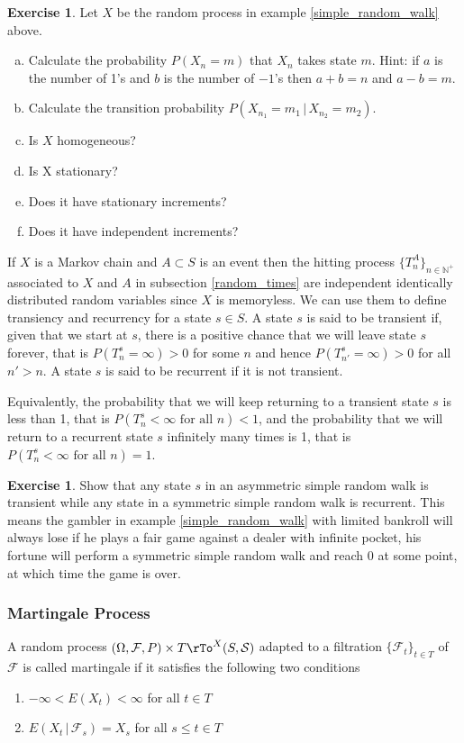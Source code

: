 \documentclass[12pt]{amsart}
\theoremstyle{definition}
\newtheorem{exercise}[theorem]{Exercise}
\begin{document}
\begin{exercise} Let $X$ be the random process in example \ref{simple_random_walk} above.
\begin{enumerate}[a.]
\item Calculate the probability $P(X_n = m)$ that $X_n$ takes state $m$. Hint: if $a$ is the number of 1's and $b$ is the number of $-1$'s then $a+b = n$ and $a - b = m$.
\item Calculate the transition probability $P(X_{n_1} = m_1 \,|\, X_{n_2} = m_2)$.
\item Is $X$ homogeneous?
\item Is X stationary?
\item Does it have stationary increments?
\item Does it have independent increments?
\end{enumerate}
\end{exercise}

If $X$ is a Markov chain and $A \subset S$ is an event then the hitting process $\{T_n^A\}_{n \in \mathbb{N}^+}$ associated to $X$ and $A$ in subsection \ref{random_times} are independent identically distributed random variables since $X$ is memoryless. We can use them to define transiency and recurrency for a state $s \in S$.
\dfn A state $s$ is said to be transient if, given that we start at $s$, there is a positive chance that we will leave state $s$ forever, that is $P(T_n^s = \infty) > 0$ for some $n$ and hence $P(T_{n'}^s = \infty) > 0$ for all $n' > n$. A state $s$ is said to be recurrent if it is not transient.

 Equivalently, the probability that we will keep returning to a transient state $s$ is less than 1, that is $P(T_n^s < \infty \text{ for all } n) < 1$, and the probability that we will return to a recurrent state $s$ infinitely many times is 1, that is $P(T_n^s < \infty \text{ for all } n) = 1$.

\begin{exercise} Show that any state $s$ in an asymmetric simple random walk is transient while any state in a symmetric simple random walk is recurrent. This means the gambler in example \ref{simple_random_walk} with limited bankroll will always lose if he plays a fair game against a dealer with infinite pocket, his fortune will perform a symmetric simple random walk and reach 0 at some point, at which time the game is over.
\end{exercise}

\subsubsection{Martingale Process} A random process $(\Omega, \mathcal{F}, P) \times T \rTo^X (S, \mathcal{S})$ adapted to a filtration $\{\mathcal{F}_t\}_{t \in T}$ of $\mathcal{F}$ is called martingale if it satisfies the following two conditions
\begin{enumerate}[1.]
\item $- \infty < E(X_t) < \infty$ for all $t \in T$
\item $E(X_t \,|\, \mathcal{F}_s) = X_s$ for all $s \leq t \in T$
\end{enumerate}
\end{document}
